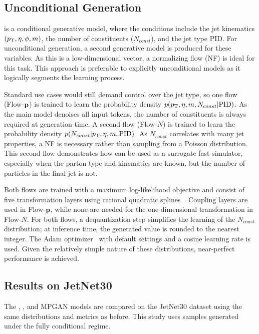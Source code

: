 \subsection{Unconditional Generation}

\pcdroid is a conditional generative model, where the conditions include the jet kinematics $(p_\mathrm{T}, \eta, \phi, m)$, the number of constituents ($N_{const}$), and the jet type PID.
For unconditional generation, a second generative model is produced for these variables.
As this is a low-dimensional vector, a normalizing flow (NF) is ideal for this task.
This approach is preferable to explicitly unconditional models as it logically segments the learning process.

Standard use cases would still demand control over the jet type, so
one flow (Flow-$\mathbf{p}$) is trained to learn the probability density $p(p_\mathrm{T}, \eta, m, N_{const} |\textrm{PID})$.
As the main model denoises all input tokens, the number of constituents is always required at generation time.
A second flow (Flow-$N$) is trained to learn the probability density $p(N_{const}|p_\mathrm{T}, \eta, m, \textrm{PID})$.
As $N_{const}$ correlates with many jet properties, a NF is necessary rather than sampling from a Poisson distribution.
This second flow demonstrates how \pcdroid can be used as a surrogate fast simulator, especially when the parton type and kinematics are known, but the number of particles in the final jet is not.

Both flows are trained with a maximum log-likelihood objective and consist of five transformation layers using rational quadratic splines~\cite{NeuralSplineFlows}.
Coupling layers are used in Flow-$\mathbf{p}$, while none are needed for the one-dimensional transformation in Flow-$N$.
For both flows, a dequantization step simplifies the learning of the $N_{const}$ distribution; at inference time, the generated value is rounded to the nearest integer.
The Adam optimizer~\cite{Adam} with default settings and a cosine learning rate is used.
Given the relatively simple nature of these distributions, near-perfect performance is achieved.

\subsection{Results on JetNet30}

The \pcdroid, \pcjedi, and MPGAN models are compared on the JetNet30 dataset using the same distributions and metrics as before.
This study uses \pcdroid samples generated under the fully conditional regime.

